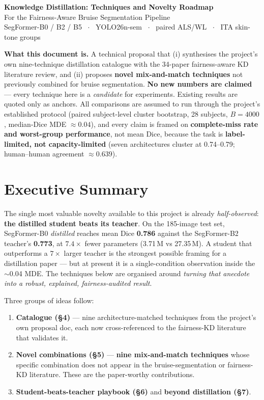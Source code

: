 \documentclass[11pt]{article}
\newcommand{\novel}[1]{\textcolor{noveltygreen}{\textbf{#1}}}
\begin{document}
\begin{center}
  {\LARGE\bfseries Knowledge Distillation: Techniques and Novelty Roadmap}\\[4pt]
  {\large For the Fairness-Aware Bruise Segmentation Pipeline}\\[2pt]
  {\small SegFormer-B0 / B2 / B5 \, $\cdot$ \, YOLO26n-sem \, $\cdot$ \, paired ALS/WL \, $\cdot$ \, ITA skin-tone groups}
\end{center}

\vspace{2pt}

\begin{scopebox}
\textbf{What this document is.} A technical proposal that (i) synthesises the project's own
nine-technique distillation catalogue with the 34-paper fairness-aware KD literature review,
and (ii) proposes \novel{novel mix-and-match techniques} not previously combined for bruise
segmentation. \textbf{No new numbers are claimed} --- every technique here is a \emph{candidate}
for experiments. Existing results are quoted only as anchors. All comparisons are assumed to run
through the project's established protocol (paired subject-level cluster bootstrap, 28 subjects,
$B{=}4000$, median-Dice MDE $\approx 0.04$), and every claim is framed on
\textbf{complete-miss rate and worst-group performance}, not mean Dice, because the task is
\textbf{label-limited, not capacity-limited} (seven architectures cluster at 0.74--0.79;
human--human agreement $\approx 0.639$).
\end{scopebox}

\section{Executive Summary}

The single most valuable novelty available to this project is already \emph{half-observed}:
\textbf{the distilled student beats its teacher}. On the 185-image test set, SegFormer-B0
\emph{distilled} reaches mean Dice \textbf{0.786} against the SegFormer-B2 teacher's
\textbf{0.773}, at $7.4\times$ fewer parameters (3.71\,M vs 27.35\,M). A student that
outperforms a $7\times$ larger teacher is the strongest possible framing for a distillation
paper --- but at present it is a single-condition observation inside the $\sim$0.04 MDE. The
techniques below are organised around \emph{turning that anecdote into a robust, explained,
fairness-audited result}.

Three groups of ideas follow:
\begin{enumerate}[leftmargin=1.4em,itemsep=1pt]
  \item \textbf{Catalogue (\S4)} --- nine architecture-matched techniques from the project's
  own proposal doc, each now cross-referenced to the fairness-KD literature that validates it.
  \item \textbf{Novel combinations (\S5)} --- \novel{nine mix-and-match techniques} whose
  specific combination does not appear in the bruise-segmentation or fairness-KD literature.
  These are the paper-worthy contributions.
  \item \textbf{Student-beats-teacher playbook (\S6)} and \textbf{beyond distillation (\S7)}.
\end{enumerate}
\end{document}

